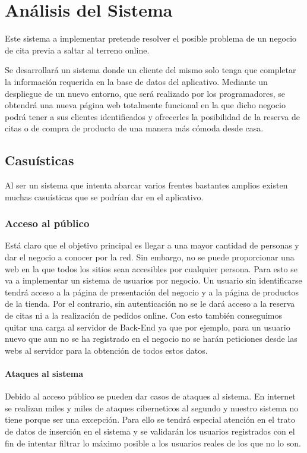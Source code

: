 \chapter{Análisis del Sistema}

Este sistema a implementar pretende resolver el posible problema de un negocio de cita previa a saltar al terreno online.

Se desarrollará un sistema donde un cliente del mismo solo tenga que completar la información requerida en la base de datos del aplicativo. Mediante un despliegue de un nuevo entorno, que será realizado por los programadores, se obtendrá una nueva página web totalmente funcional en la que dicho negocio podrá tener a sus clientes identificados y ofrecerles la posibilidad de la reserva de citas o de compra de producto de una manera más cómoda desde casa.

\section{Casuísticas}

Al ser un sistema que intenta abarcar varios frentes bastantes amplios existen muchas casuísticas que se podrían dar en el aplicativo.

\subsection{Acceso al público}

Está claro que el objetivo principal es llegar a una mayor cantidad de personas y dar el negocio a conocer por la red. Sin embargo, no se puede proporcionar una web en la que todos los sitios sean accesibles por cualquier persona. Para esto se va a implementar un sistema de usuarios por negocio. Un usuario sin identificarse tendrá acceso a la página de presentación del negocio y a la página de productos de la tienda. Por el contrario, sin autenticación no se le dará acceso a la reserva de citas ni a la realización de pedidos online. Con esto también conseguimos quitar una carga al servidor de Back-End ya que por ejemplo, para un usuario nuevo que aun no se ha registrado en el negocio no se harán peticiones desde las webs al servidor para la obtención de todos estos datos.

\subsubsection{Ataques al sistema}

Debido al acceso público se pueden dar casos de ataques al sistema. En internet se realizan miles y miles de ataques ciberneticos al segundo y nuestro sistema no tiene porque ser una excepción. Para ello se tendrá especial atención en el trato de datos de inserción en el sistema y se validarán los usuarios registrados con el fin de intentar filtrar lo máximo posible a los usuarios reales de los que no lo son.

